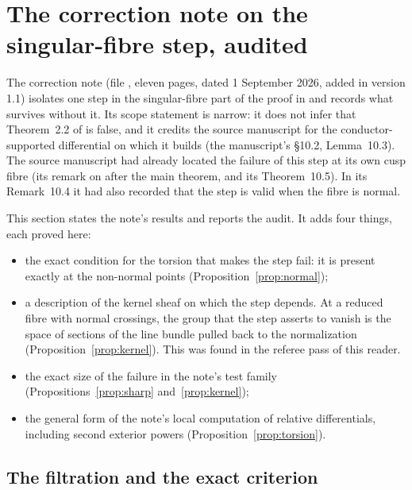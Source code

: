 \section{The correction note on the singular-fibre step, audited}\label{sec:correction}

The correction note (file , eleven pages, dated 1 September 2026, added in version 1.1) isolates one step in the singular-fibre part of the proof in \cite{CDP20} and records what survives without it. Its scope statement is narrow: it does not infer that Theorem~2.2 of \cite{CDP20} is false, and it credits the source manuscript for the conductor-supported differential on which it builds (the manuscript's §10.2, Lemma~10.3). The source manuscript had already located the failure of this step at its own cusp fibre (its remark on \cite{CDP20} after the main theorem, and its Theorem~10.5). In its Remark~10.4 it had also recorded that the step is valid when the fibre is normal.

This section states the note's results and reports the audit. It adds four things, each proved here:
\begin{itemize}
\item the exact condition for the torsion that makes the step fail: it is present exactly at the non-normal points (Proposition~\ref{prop:normal});
\item a description of the kernel sheaf on which the step depends. At a reduced fibre with normal crossings, the group that the step asserts to vanish is the space of sections of the line bundle pulled back to the normalization (Proposition~\ref{prop:kernel}). This was found in the referee pass of this reader.
\item the exact size of the failure in the note's test family (Propositions~\ref{prop:sharp} and~\ref{prop:kernel});
\item the general form of the note's local computation of relative differentials, including second exterior powers (Proposition~\ref{prop:torsion}).
\end{itemize}

\subsection{The filtration and the exact criterion}

